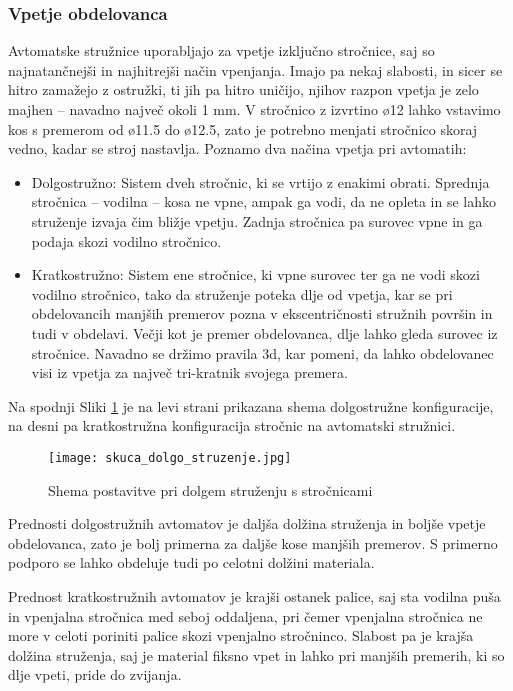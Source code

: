 \subsubsection{Vpetje obdelovanca}
Avtomatske stružnice uporabljajo za vpetje izključno stročnice,
saj so najnatančnejši in najhitrejši način vpenjanja. Imajo pa nekaj slabosti,
in sicer se hitro zamažejo z ostružki, ti jih pa hitro uničijo,
njihov razpon vpetja je zelo majhen -- navadno največ okoli 1 mm. V stročnico z
izvrtino ø12 lahko vstavimo kos s premerom od ø11.5 do ø12.5,
zato je potrebno menjati stročnico skoraj vedno, kadar se stroj nastavlja.
Poznamo dva načina vpetja pri avtomatih:
\begin{itemize}
	\item Dolgostružno: Sistem dveh stročnic, ki se vrtijo z
	      enakimi obrati. Sprednja stročnica -- vodilna -- kosa ne vpne,
	      ampak ga vodi, da ne opleta in se lahko struženje izvaja čim
	      bližje vpetju. Zadnja stročnica pa surovec vpne in ga podaja
	      skozi vodilno stročnico.
	\item Kratkostružno: Sistem ene stročnice, ki vpne surovec
	      ter ga ne vodi skozi vodilno stročnico, tako da struženje
	      poteka dlje od vpetja, kar se pri obdelovancih manjših
	      premerov pozna v ekscentričnosti stružnih površin in tudi v obdelavi.
	      Večji kot je premer obdelovanca, dlje lahko gleda surovec iz stročnice.
	      Navadno se držimo pravila 3d, kar pomeni, da lahko obdelovanec visi
	      iz vpetja za največ tri-kratnik svojega premera.
\end{itemize}

Na spodnji Sliki \ref{tipi_vodilnih_pus} je na levi strani prikazana
shema dolgostružne konfiguracije, na desni pa kratkostružna konfiguracija
stročnic na avtomatski stružnici.

\begin{figure}
	\begin{center}
		\texttt{[image: skuca\_dolgo\_struzenje.jpg]}
		\caption{Shema postavitve pri dolgem struženju s stročnicami
			\cite{interna}}
		\label{tipi_vodilnih_pus}
	\end{center}
\end{figure}

Prednosti dolgostružnih avtomatov je daljša dolžina struženja
in boljše vpetje obdelovanca, zato je bolj primerna za daljše
kose manjših premerov. S primerno podporo se lahko obdeluje
tudi po celotni dolžini materiala.

Prednost kratkostružnih avtomatov je krajši ostanek palice,
saj sta vodilna puša in vpenjalna stročnica med seboj oddaljena, pri čemer vpenjalna stročnica ne more v celoti poriniti palice skozi vpenjalno
stročninco. Slabost pa je krajša dolžina struženja, saj je material
fiksno vpet in lahko pri manjših premerih, ki so dlje vpeti, pride
do zvijanja.

